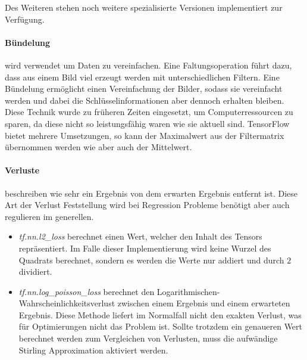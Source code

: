 \noindent
Des Weiteren stehen noch weitere spezialisierte Versionen implementiert zur Verfügung.

\paragraph{Bündelung} wird verwendet um Daten zu vereinfachen. 
Eine Faltungsoperation führt dazu, dass aus einem Bild viel erzeugt werden mit unterschiedlichen Filtern. 
Eine Bündelung ermöglicht einen Vereinfachung der Bilder, sodass sie vereinfacht werden und dabei die Schlüsselinformationen aber dennoch erhalten bleiben. 
Diese Technik wurde zu früheren Zeiten eingesetzt, um Computerressourcen zu sparen, da diese nicht so leistungsfähig waren wie sie aktuell sind. 
TensorFlow bietet mehrere Umsetzungen, so kann der Maximalwert aus der Filtermatrix übernommen werden wie aber auch der Mittelwert. 

\paragraph{Verluste} beschreiben wie sehr ein Ergebnis von dem erwarten Ergebnis entfernt ist. 
Diese Art der Verlust Feststellung wird bei Regression Probleme benötigt aber auch regulieren im generellen.
\begin{itemize}
	\item \textit{tf.nn.l2\_loss} berechnet einen Wert, welcher den Inhalt des Tensors repräsentiert. 
	Im Falle dieser Implementierung wird keine Wurzel des Quadrats berechnet, sondern es werden die Werte nur addiert und durch $2$ dividiert.
	\item \textit{tf.nn.log\_poisson\_loss} berechnet den Logarithmischen-Wahrscheinlichkeitsverlust zwischen einem Ergebnis und einem erwarteten Ergebnis. 
	Diese Methode liefert im Normalfall nicht den exakten Verlust, was für Optimierungen nicht das Problem ist. 
	Sollte trotzdem ein genaueren Wert berechnet werden zum Vergleichen von Verlusten, muss die aufwändige Stirling Approximation aktiviert werden. 
\end{itemize}

